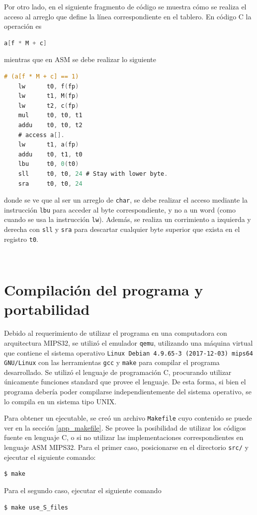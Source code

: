 \documentclass[a4paper,12pt]{article}
\numberwithin{equation}{section}
\numberwithin{figure}{section}
\begin{document}
	Por otro lado, en el siguiente fragmento de código se muestra cómo se realiza el acceso al arreglo que define la línea correspondiente en el tablero. En código C la operación es
	\begin{lstlisting}[language=C, style=StyleC]
	a[f * M + c]
	\end{lstlisting}
	mientras que en ASM se debe realizar lo siguiente
	\begin{lstlisting}[language=C, style=StyleC]
	# (a[f * M + c] == 1)
	lw		t0, f(fp)
	lw		t1, M(fp)
	lw		t2, c(fp)
	mul     t0, t0, t1
	addu    t0, t0, t2
	# access a[].
	lw      t1, a(fp)
	addu    t0, t1, t0
	lbu		t0, 0(t0)
	sll     t0, t0, 24 # Stay with lower byte.
	sra     t0, t0, 24
	\end{lstlisting}
	donde se ve que al ser un arreglo de \texttt{char}, se debe realizar el acceso mediante la instrucción \texttt{lbu} para acceder al byte correspondiente, y no a un word (como cuando se usa la instrucción \texttt{lw}). Además, se realiza un corrimiento a izquierda y derecha con \texttt{sll} y \texttt{sra} para descartar cualquier byte superior que exista en el registro \texttt{t0}.
	\begin{lstlisting}[language=C, style=StyleC]
	
	\end{lstlisting}
	\section{Compilación del programa y portabilidad}
	
	Debido al requerimiento de utilizar el programa en una computadora con arquitectura MIPS32, se utilizó el emulador \texttt{qemu}, utilizando una máquina virtual que contiene el sistema operativo \texttt{Linux Debian 4.9.65-3 (2017-12-03) mips64 GNU/Linux} con las herramientas \texttt{gcc} y \texttt{make} para compilar el programa desarrollado. Se utilizó el lenguaje de programación C, procurando utilizar únicamente funciones standard que provee el lenguaje. De esta forma, si bien el programa debería poder compilarse independientemente del sistema operativo, se lo compila en un sistema tipo UNIX.
	
	Para obtener un ejecutable, se creó un archivo \texttt{Makefile} cuyo contenido se puede ver en la sección \ref{app_makefile}. Se provee la posibilidad de utilizar los códigos fuente en lenguaje C, o si no utilizar las implementaciones correspondientes en lenguaje ASM MIPS32. Para el primer caso, posicionarse en el directorio \texttt{src/} y ejecutar el siguiente comando:
	\begin{lstlisting}[language=bash, style=StyleC]
	$ make 
	\end{lstlisting}
	Para el segundo caso, ejecutar el siguiente comando
	\begin{lstlisting}[language=bash, style=StyleC]
	$ make use_S_files
	\end{lstlisting}
	
\end{document}
